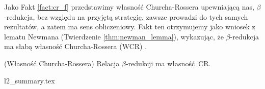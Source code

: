 Jako Fakt \ref{fact:cr_f} przedstawimy własność Churcha-Rossera upewniającą nas, \mbox{\(\beta\)-redukcja}, bez względu na przyjętą strategię, zawsze prowadzi do tych samych rezultatów, a zatem ma sens obliczeniowy. Fakt ten otrzymujemy jako wniosek z lematu Newmana (Twierdzenie \ref{thm:newman_lemma}), wykazując, że \(\beta\)-redukcja ma słabą własność Churcha-Rossera (WCR) \cite[Twierdzenie 11.2.12]{Urzyczyn2006}.

\begin{fakt}(Własność Churcha-Rossera)\label{fact:cr_f}
  Relacja \(\beta\)-redukcji ma własność CR.
\end{fakt}


{l2_summary.tex}
